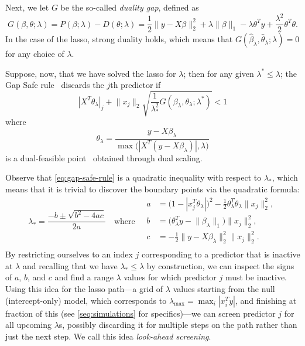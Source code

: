 \documentclass[b5paper,10pt,abstractoff,DIV=calc,headings=normal,twoside]{scrartcl}
\theoremstyle{plain}
\theoremstyle{definition}
\theoremstyle{remark}
\begin{document}
Next, we let \(G\) be the so-called \emph{duality gap}, defined as
\begin{equation}
  G(\beta, \theta; \lambda)
  = P(\beta; \lambda) - D(\theta; \lambda)
  =
  \frac 12 \lVert y - X\beta\rVert_2^2 + \lambda \lVert \beta \rVert_1
  - \lambda \theta^T y + \frac{\lambda^2}{2} \theta^T \theta.
\end{equation}
In the case of the lasso, strong duality holds, which means that
\(G(\hat\beta_\lambda, \hat\theta_\lambda; \lambda) = 0\) for any
choice of \(\lambda\).

Suppose, now, that we have solved the lasso for \(\lambda\); then
for any given \(\lambda^* \leq \lambda\);
the Gap Safe rule~\citep{ndiaye2017} discards the \(j\)th
predictor if
\begin{equation}
  \label{eq:gap-safe-rule}
  |X^T \theta_\lambda|_j + \lVert x_j\rVert_2
  \sqrt{\frac{1}{\lambda_*^2}
    G(\beta_\lambda, \theta_\lambda; \lambda^*)}
  < 1
\end{equation}
where
\[
  \theta_\lambda = \frac{y - X\beta_\lambda}{
    \max\big( |X^T(y - X\beta_\lambda)|, \lambda\big)}
\]
is a dual-feasible point~\cite{ndiaye2017} obtained through dual scaling.

Observe that \eqref{eq:gap-safe-rule} is a quadratic inequality with
respect to \(\lambda_*\), which
means that it is trivial to discover the boundary points via the
quadratic formula:
\[
  \lambda_* = \frac{-b \pm \sqrt{b^2 - 4ac}}{2a} \quad \text{where} \quad
  \begin{aligned}
    a & = \big( 1 - | x_j^T \theta_\lambda|\big)^2 -
    \frac 12 \theta_\lambda^T \theta_\lambda \lVert x_j\rVert_2^2,      \\
    b & = \big(\theta_\lambda^T y - \lVert \beta_\lambda \rVert_1\big)
    \lVert x_j \rVert_2^2,                                                          \\
    c & = - \frac 12 \lVert y - X\beta_\lambda\rVert_2^2
    \lVert x_j\rVert_2^2.                                                          \\
  \end{aligned}
\]
By restricting ourselves to an index \(j\) corresponding to a predictor that is
inactive at \(\lambda\) and recalling that we have \(\lambda_* \leq \lambda\) by
construction, we can inspect the signs of \(a\), \(b\), and \(c\) and find a
range \(\lambda\) values for which predictor \(j\) must be inactive. Using this
idea for the lasso path---a grid of \(\lambda\) values starting from the null
(intercept-only) model, which corresponds to \(\lambda_\text{max} =
\max_i|x_i^Ty|\), and finishing at fraction of this (see
\autoref{seq:simulations} for specifics)---we can screen predictor \(j\) for all
upcoming \(\lambda\)s, possibly discarding it for multiple steps on the path
rather than just the next step. We call this idea \emph{look-ahead screening}.
\end{document}
